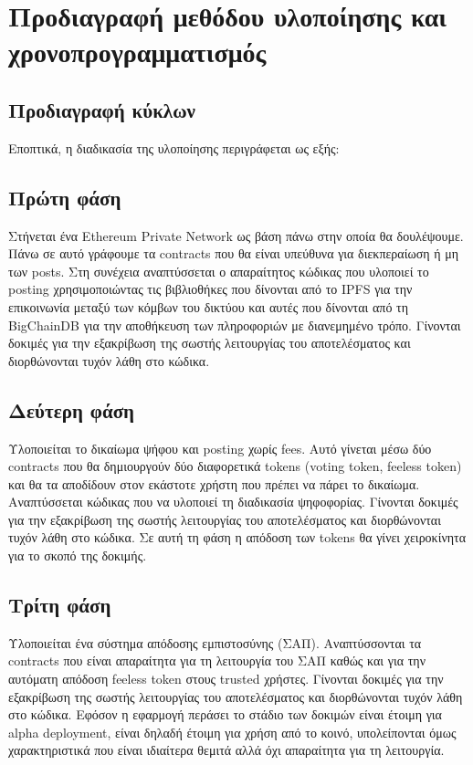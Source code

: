 \section{Προδιαγραφή μεθόδου υλοποίησης και χρονοπρογραμματισμός} \label{section:3-6-implementation-methodology-specification}

\subsection{Προδιαγραφή κύκλων}

Εποπτικά, η διαδικασία της υλοποίησης περιγράφεται ως εξής:


\subsection{Πρώτη φάση}

Στήνεται ένα Ethereum Private Network ως βάση πάνω στην οποία θα δουλέψουμε. Πάνω σε αυτό γράφουμε τα contracts που θα είναι υπεύθυνα για διεκπεραίωση ή μη των posts.
Στη συνέχεια αναπτύσσεται ο απαραίτητος κώδικας που υλοποιεί το posting χρησιμοποιώντας τις βιβλιοθήκες που δίνονται από το IPFS για την επικοινωνία μεταξύ των κόμβων του δικτύου και αυτές που δίνονται από τη BigChainDB για την αποθήκευση των πληροφοριών με διανεμημένο τρόπο.
Γίνονται δοκιμές για την εξακρίβωση της σωστής λειτουργίας του αποτελέσματος και διορθώνονται τυχόν λάθη στο κώδικα.

\subsection{Δεύτερη φάση}

Υλοποιείται το δικαίωμα ψήφου και posting χωρίς fees. Αυτό γίνεται μέσω δύο contracts που θα δημιουργούν δύο διαφορετικά tokens (voting token, feeless token) και θα τα αποδίδουν στον εκάστοτε χρήστη που πρέπει να πάρει το δικαίωμα.
Αναπτύσσεται κώδικας που να υλοποιεί τη διαδικασία ψηφοφορίας.
Γίνονται δοκιμές για την εξακρίβωση της σωστής λειτουργίας του αποτελέσματος και διορθώνονται τυχόν λάθη στο κώδικα. Σε αυτή τη φάση η απόδοση των tokens θα γίνει χειροκίνητα για το σκοπό της δοκιμής.

\subsection{Τρίτη φάση}

Υλοποιείται ένα σύστημα απόδοσης εμπιστοσύνης (ΣΑΠ).
Αναπτύσσονται τα contracts που είναι απαραίτητα για τη λειτουργία του ΣΑΠ καθώς και για την αυτόματη απόδοση feeless token στους trusted χρήστες.
Γίνονται δοκιμές για την εξακρίβωση της σωστής λειτουργίας του αποτελέσματος και διορθώνονται τυχόν λάθη στο κώδικα.
Εφόσον η εφαρμογή περάσει το στάδιο των δοκιμών είναι έτοιμη για alpha deployment, είναι δηλαδή έτοιμη για χρήση από το κοινό, υπολείπονται όμως χαρακτηριστικά που είναι ιδιαίτερα θεμιτά αλλά όχι απαραίτητα για τη λειτουργία.


